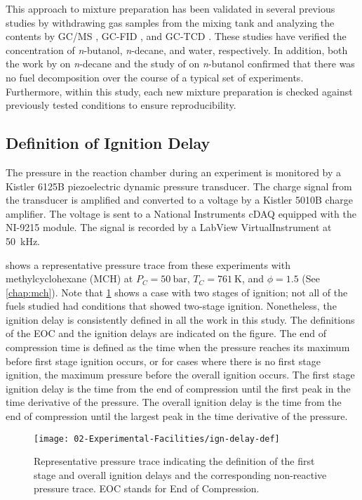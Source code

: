 \documentclass[../main.tex]{subfiles}
\begin{document}
This approach to mixture preparation has been validated in several previous
studies by withdrawing gas samples from the mixing tank and analyzing the
contents by GC/MS \cite{Weber2011}, GC-FID \cite{Kumar2009}, and GC-TCD
\cite{Das2012}. These studies have verified the concentration of
\textit{n}-butanol, \textit{n}-decane, and water, respectively. In addition,
both the work by \textcite{Kumar2009} on \textit{n}-decane and the study of
\textcite{Weber2011} on \textit{n}-butanol confirmed that there was no fuel
decomposition over the course of a typical set of experiments. Furthermore,
within this study, each new mixture preparation is checked against previously
tested conditions to ensure reproducibility.

\subsection{Definition of Ignition Delay}
\label{sec:ig-delay-def}

The pressure in the reaction chamber during an experiment is monitored by a
Kistler 6125B piezoelectric dynamic pressure transducer. The charge signal from the
transducer is amplified and converted to a voltage by a Kistler 5010B charge amplifier.
The voltage is sent to a National Instruments cDAQ equipped with the NI-9215 module.
The signal is recorded by a LabView VirtualInstrument at \SI{50}{\kilo\hertz}.

 shows a representative pressure trace from
these experiments with methylcyclohexane (MCH) at $P_C= \SI{50}{\bar}$, $T_C=\SI{761}{\kelvin}$,
and $\phi=\num{1.5}$ (See \cref{chap:mch}). Note that \cref{fig:ig-delay-def}
shows a case with two stages of ignition; not all of the fuels studied
had conditions that showed two-stage ignition. Nonetheless, the ignition
delay is consistently defined in all the work in this study. The
definitions of the EOC and the ignition delays are indicated on the figure.
The end of compression time is defined as the time when the pressure
reaches its maximum before first stage ignition occurs, or for cases
where there is no first stage ignition, the maximum pressure before
the overall ignition occurs. The first stage ignition delay is the time
from the end of compression until the first peak in the time derivative
of the pressure. The overall ignition delay is the time from the end of
compression until the largest peak in the time derivative of the pressure.

\begin{figure}
    \texttt{[image: 02-Experimental-Facilities/ign-delay-def]}
    \caption{Representative pressure trace indicating the definition of
    the first stage and overall ignition delays and the corresponding
    non-reactive pressure trace. EOC stands for End of Compression.}
    \label{fig:ig-delay-def}
\end{figure}
\end{document}
